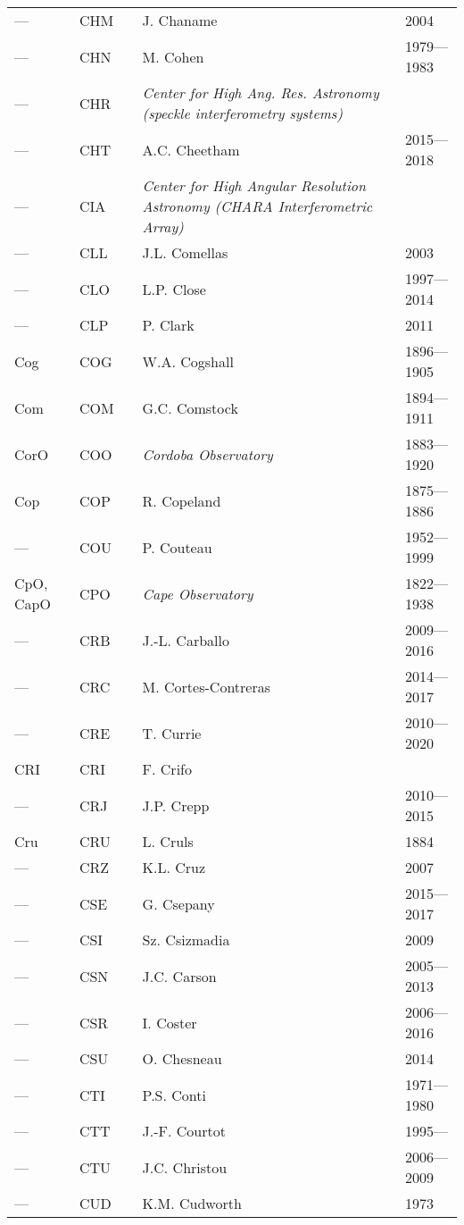 \begin{longtable}{l|l|c|p{59mm}|l}
--- & CHM &   & J. Chaname & 2004 \\
--- & CHN &   & M. Cohen & 1979---1983 \\
--- & CHR &   & \emph{Center for High Ang. Res. Astronomy (speckle interferometry systems)} & \\
--- & CHT &   & A.C. Cheetham & 2015---2018 \\
--- & CIA &   & \emph{Center for High Angular Resolution Astronomy (CHARA Interferometric Array)} & \\
--- & CLL &   & J.L. Comellas & 2003 \\
--- & CLO &   & L.P. Close & 1997---2014 \\
--- & CLP &   & P. Clark & 2011 \\
Cog & COG &   & W.A. Cogshall & 1896---1905 \\
Com & COM &   & G.C. Comstock & 1894---1911 \\
CorO & COO &   & \emph{Cordoba Observatory} & 1883---1920 \\
Cop & COP &   & R. Copeland & 1875---1886 \\
--- & COU &   & P. Couteau & 1952---1999 \\
CpO, CapO & CPO &   & \emph{Cape Observatory} & 1822---1938 \\
--- & CRB &   & J.-L. Carballo & 2009---2016 \\
--- & CRC &   & M. Cortes-Contreras & 2014---2017 \\
--- & CRE &   & T. Currie & 2010---2020 \\
CRI & CRI &   & F. Crifo & \\
--- & CRJ &   & J.P. Crepp & 2010---2015 \\
Cru & CRU &   & L. Cruls & 1884 \\
---	& CRZ &   & K.L. Cruz & 2007 \\
--- & CSE &   & G. Csepany & 2015---2017 \\
--- & CSI &   & Sz. Csizmadia & 2009 \\
--- & CSN &   & J.C. Carson & 2005---2013 \\
--- & CSR &   & I. Coster & 2006---2016 \\
--- & CSU &   & O. Chesneau & 2014 \\
--- & CTI &   & P.S. Conti & 1971---1980 \\
--- & CTT &   & J.-F. Courtot & 1995--- \\
--- & CTU &   & J.C. Christou & 2006---2009 \\
--- & CUD &   & K.M. Cudworth & 1973 \\

\end{longtable}
